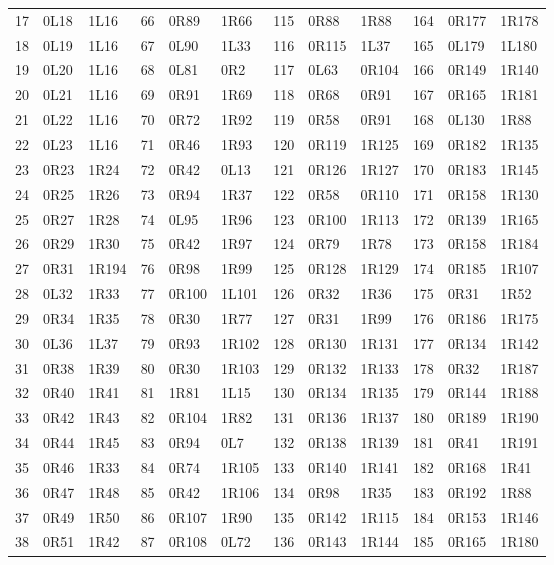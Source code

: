 \begin{center}
\begin{tabular}{rll@{\hspace{1.2em}}rll@{\hspace{1.2em}}rll@{\hspace{1.2em}}rll}
17 & 0L18 & 1L16 & 66 & 0R89 & 1R66 & 115 & 0R88 & 1R88 & 164 & 0R177 & 1R178\\
18 & 0L19 & 1L16 & 67 & 0L90 & 1L33 & 116 & 0R115 & 1L37 & 165 & 0L179 & 1L180\\
19 & 0L20 & 1L16 & 68 & 0L81 & 0R2 & 117 & 0L63 & 0R104 & 166 & 0R149 & 1R140\\
20 & 0L21 & 1L16 & 69 & 0R91 & 1R69 & 118 & 0R68 & 0R91 & 167 & 0R165 & 1R181\\
21 & 0L22 & 1L16 & 70 & 0R72 & 1R92 & 119 & 0R58 & 0R91 & 168 & 0L130 & 1R88\\
22 & 0L23 & 1L16 & 71 & 0R46 & 1R93 & 120 & 0R119 & 1R125 & 169 & 0R182 & 1R135\\
23 & 0R23 & 1R24 & 72 & 0R42 & 0L13 & 121 & 0R126 & 1R127 & 170 & 0R183 & 1R145\\
24 & 0R25 & 1R26 & 73 & 0R94 & 1R37 & 122 & 0R58 & 0R110 & 171 & 0R158 & 1R130\\
25 & 0R27 & 1R28 & 74 & 0L95 & 1R96 & 123 & 0R100 & 1R113 & 172 & 0R139 & 1R165\\
26 & 0R29 & 1R30 & 75 & 0R42 & 1R97 & 124 & 0R79 & 1R78 & 173 & 0R158 & 1R184\\
27 & 0R31 & 1R194 & 76 & 0R98 & 1R99 & 125 & 0R128 & 1R129 & 174 & 0R185 & 1R107\\
28 & 0L32 & 1R33 & 77 & 0R100 & 1L101 & 126 & 0R32 & 1R36 & 175 & 0R31 & 1R52\\
29 & 0R34 & 1R35 & 78 & 0R30 & 1R77 & 127 & 0R31 & 1R99 & 176 & 0R186 & 1R175\\
30 & 0L36 & 1L37 & 79 & 0R93 & 1R102 & 128 & 0R130 & 1R131 & 177 & 0R134 & 1R142\\
31 & 0R38 & 1R39 & 80 & 0R30 & 1R103 & 129 & 0R132 & 1R133 & 178 & 0R32 & 1R187\\
32 & 0R40 & 1R41 & 81 & 1R81 & 1L15 & 130 & 0R134 & 1R135 & 179 & 0R144 & 1R188\\
33 & 0R42 & 1R43 & 82 & 0R104 & 1R82 & 131 & 0R136 & 1R137 & 180 & 0R189 & 1R190\\
34 & 0R44 & 1R45 & 83 & 0R94 & 0L7 & 132 & 0R138 & 1R139 & 181 & 0R41 & 1R191\\
35 & 0R46 & 1R33 & 84 & 0R74 & 1R105 & 133 & 0R140 & 1R141 & 182 & 0R168 & 1R41\\
36 & 0R47 & 1R48 & 85 & 0R42 & 1R106 & 134 & 0R98 & 1R35 & 183 & 0R192 & 1R88\\
37 & 0R49 & 1R50 & 86 & 0R107 & 1R90 & 135 & 0R142 & 1R115 & 184 & 0R153 & 1R146\\
38 & 0R51 & 1R42 & 87 & 0R108 & 0L72 & 136 & 0R143 & 1R144 & 185 & 0R165 & 1R180\\

\end{tabular}
\end{center}
